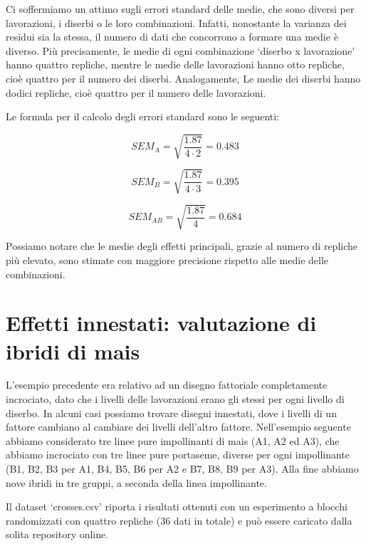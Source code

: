\documentclass[a4paper,12pt,oneside]{book}
\begin{document}
Ci soffermiamo un attimo sugli errori standard delle medie, che sono diversi per lavorazioni, i diserbi o le loro combinazioni. Infatti, nonostante la varianza dei residui sia la stessa, il numero di dati che concorrono a formare una medie è diverso. Più precisamente, le medie di ogni combinazione `diserbo x lavorazione' hanno quattro repliche, mentre le medie delle lavorazioni hanno otto repliche, cioè quattro per il numero dei diserbi. Analogamente, Le medie dei diserbi hanno dodici repliche, cioè quattro per il numero delle lavorazioni.

Le formula per il calcolo degli errori standard sono le seguenti:

\[SEM_A = \sqrt{\frac{1.87}{4 \cdot 2}} = 0.483\]

\[SEM_B = \sqrt{\frac{1.87}{4 \cdot 3}} = 0.395\]

\[SEM_{AB} = \sqrt{\frac{1.87}{4}} = 0.684\]

Possiamo notare che le medie degli effetti principali, grazie al numero di repliche più elevato, sono stimate con maggiore precisione rispetto alle medie delle combinazioni.

\hypertarget{effetti-innestati-valutazione-di-ibridi-di-mais}{%
\section{Effetti innestati: valutazione di ibridi di mais}\label{effetti-innestati-valutazione-di-ibridi-di-mais}}

L'esempio precedente era relativo ad un disegno fattoriale completamente incrociato, dato che i livelli delle lavorazioni erano gli stessi per ogni livello di diserbo. In alcuni casi possiamo trovare disegni innestati, dove i livelli di un fattore cambiano al cambiare dei livelli dell'altro fattore. Nell'esempio seguente abbiamo considerato tre linee pure impollinanti di mais (A1, A2 ed A3), che abbiamo incrociato con tre linee pure portaseme, diverse per ogni impollinante (B1, B2, B3 per A1, B4, B5, B6 per A2 e B7, B8, B9 per A3). Alla fine abbiamo nove ibridi in tre gruppi, a seconda della linea impollinante.

Il dataset `crosses.csv' riporta i risultati ottenuti con un esperimento a blocchi randomizzati con quattro repliche (36 dati in totale) e può essere caricato dalla solita repository online.
\end{document}
